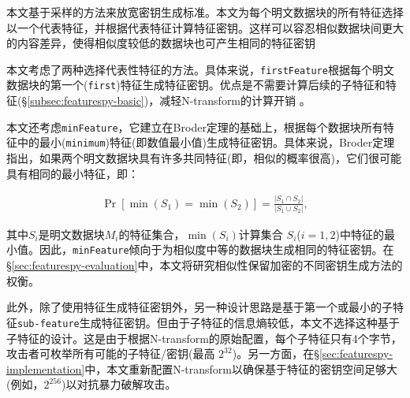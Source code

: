 本文基于采样的方法\cite{bhagwat2009extreme, dong2011Tradeoffs, qin17}来放宽密钥生成标准。本文为每个明文数据块的所有特征选择以一个代表特征，并根据代表特征计算特征密钥。这样可以容忍相似数据块间更大的内容差异，使得相似度较低的数据块也可产生相同的特征密钥

本文考虑了两种选择代表性特征的方法。具体来说，{\tt firstFeature}根据每个明文数据块的第一个({\tt first})特征生成特征密钥。优点是不需要计算后续的子特征和特征(\S\ref{subsec:featurespy-basic})，减轻N-transform的计算开销 \cite{zhang2019Finesse}。

本文还考虑{\tt minFeature}，它建立在Broder定理\cite{broder1997resemblance}的基础上，根据每个数据块所有特征中的最小({\tt minimum})特征(即数值最小值)生成特征密钥。具体来说，Broder定理指出，如果两个明文数据块具有许多共同特征(即，相似的概率很高)，它们很可能具有相同的最小特征，即：

\begin{eqnarray}
    \label{eq:featurespy-broder}
    \Pr[\min(S_1) = \min(S_2)] = \frac{|S_1 \cap S_2|}{|S_1 \cup S_2|},
\end{eqnarray}

其中$S_i$是明文数据块$M_i$的特征集合，$\min(S_i)$计算集合 $S_i$($i = 1, 2$)中特征的最小值。因此，{\tt minFeature}倾向于为相似度中等的数据块生成相同的特征密钥。在\S\ref{sec:featurespy-evaluation}中，本文将研究相似性保留加密的不同密钥生成方法的权衡。

此外，除了使用特征生成特征密钥外，另一种设计思路是基于第一个或最小的子特征{\tt sub-feature}生成特征密钥。但由于子特征的信息熵较低，本文不选择这种基于子特征的设计。这是由于根据N-transform的原始配置\cite{shilane12}，每个子特征只有4个字节，攻击者可枚举所有可能的子特征/密钥(最高 $2^{32}$)。另一方面，在\S\ref{sec:featurespy-implementation}中，本文重新配置N-transform以确保基于特征的密钥空间足够大(例如，$2^{256}$)以对抗暴力破解攻击。